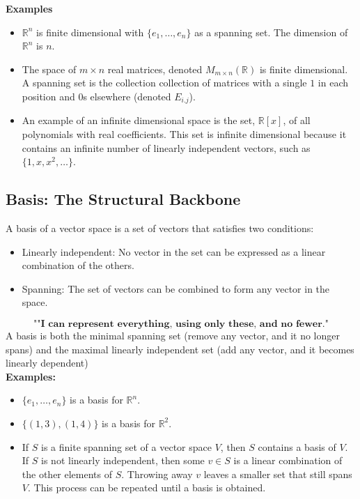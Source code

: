 \documentclass[a4paper, 9pt]{extarticle}
\begin{document}
\noindent \textbf{Examples} \\
\begin{itemize}
  \item $\mathbb{R}^n$ is finite dimensional with $\{e_1, \dots, e_n\}$ as a spanning set. The dimension of $\mathbb{R}^n$ is $n$.
  \item The space of $m \times n$ real matrices, denoted $M_{m \times n}(\mathbb{R})$ is finite dimensional. A spanning set is the collection collection of matrices with a single $1$ in each position and $0$s elsewhere (denoted $E_{i.j}$).
  \item An example of an infinite dimensional space is the set, $\mathbb{R}[x]$, of all polynomials with real coefficients. This set is infinite dimensional because it contains an infinite number of linearly independent vectors, such as $\{1, x, x^2, \ldots\}$.
\end{itemize}
\subsection{Basis: The Structural Backbone}
\begin{definitionbox}{}{}
  A basis of a vector space is a set of vectors that satisfies two conditions:
  \begin{itemize}
    \item Linearly independent: No vector in the set can be expressed as a linear combination of the others.
    \item Spanning: The set of vectors can be combined to form any vector in the space.
  \end{itemize}
\end{definitionbox}
$$\textbf{""I can represent everything, using only these, and no fewer."}$$
\noindent A basis is both the minimal spanning set (remove any vector, and it no longer spans) and the maximal linearly independent set (add any vector, and it becomes linearly dependent) \\[2ex]
\textbf{Examples:}
\begin{itemize}
  \item  $\{e_1, \dots , e_n\}$ is a basis for $\mathbb{R}^n$.
  \item $\{(1,3), (1,4)\}$ is a basis for $\mathbb{R}^2$.
  \item If $S$ is a finite spanning set of a vector space $V$, then $S$ contains a basis of $V$. If $S$ is not linearly independent, then some $v \in S$ is a linear combination of the other elements of $S$. Throwing away $v$ leaves a smaller set that still spans $V$. This process can be repeated until a basis is obtained.
\end{itemize}
\end{document}
